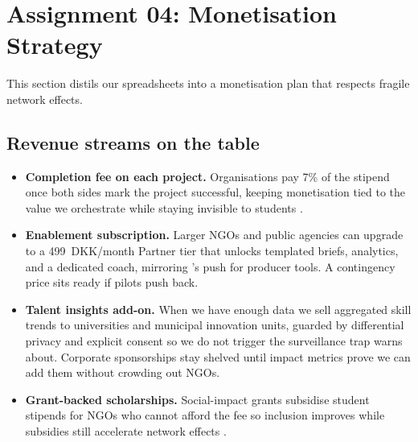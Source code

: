 \section*{Assignment 04: Monetisation Strategy}

This section distils our spreadsheets into a monetisation plan that respects fragile network effects.

\subsection*{Revenue streams on the table}
\begin{itemize}
  \item \textbf{Completion fee on each project.} Organisations pay 7\% of the stipend once both sides mark the project successful, keeping monetisation tied to the value we orchestrate while staying invisible to students \citep{HagiuWright2013}.
  \item \textbf{Enablement subscription.} Larger NGOs and public agencies can upgrade to a 499~DKK/month Partner tier that unlocks templated briefs, analytics, and a dedicated coach, mirroring \citet{Choudary2016}'s push for producer tools. A contingency price sits ready if pilots push back.
  \item \textbf{Talent insights add-on.} When we have enough data we sell aggregated skill trends to universities and municipal innovation units, guarded by differential privacy and explicit consent so we do not trigger the surveillance trap \citet{Zuboff2019} warns about. Corporate sponsorships stay shelved until impact metrics prove we can add them without crowding out NGOs.
  \item \textbf{Grant-backed scholarships.} Social-impact grants subsidise student stipends for NGOs who cannot afford the fee so inclusion improves while subsidies still accelerate network effects \citep{ShapiroVarian1999}.
\end{itemize}

